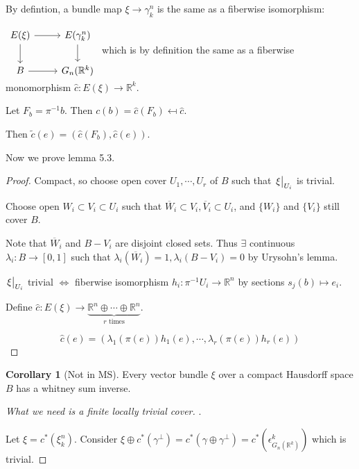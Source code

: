 \documentclass{article}
\theoremstyle{definition}
\newtheorem{corollary}[theorem]{Corollary}
\begin{document}
    By defintion, a bundle map \(\xi \to \gamma_k^n\) is the same as a fiberwise isomorphism:
    
    \(\begin{tikzcd}E(\xi) \ar[r] \ar[d] & E(\gamma_k^n) \ar[d] \\ B \ar[r] & G_n(\mathbb{R}^k)\end{tikzcd}\) which is by definition the same as a fiberwise monomorphism \(\hat{c}: E(\xi) \to \mathbb{R}^k\).

    Let \(F_b = \pi ^{-1} b\). Then \(c(b) = \hat{c}(F_b) \mapsfrom \hat{c}\).

    Then \(\widetilde{c}(e) = (\hat{c}(F_b), \hat{c}(e))\).
    
    Now we prove lemma 5.3.

    \begin{proof}
        Compact, so choose open cover \(U_1, \cdots , U_r\) of \(B\) such that \(\eval{\xi}_{U_i}\) is trivial.
        
        Choose open \(W_i \subset V_i \subset U_i\) such that \(\overline{W}_i \subset V_i, \overline{V}_i \subset U_i\), and \(\{ W_i \}\) and \(\{ V_i \}\) still cover \(B\).

        Note that \(\overline{W}_i\) and \(B - V_i\) are disjoint closed sets. Thus \(\exists\) continuous \(\lambda_i: B \to [0,1]\) such that \(\lambda_i(\overline{W}_i) = 1, \lambda_i(B - V_i) = 0\) by Urysohn's lemma.

        \(\eval{\xi}_{U_i}\) trivial \(\iff\) fiberwise isomorphism \(h_i: \pi ^{-1} U_i \to \mathbb{R}^n\) by sections \(s_j(b) \mapsto e_i\).

        Define \(\hat{c}: E(\xi) \to \underbrace{\mathbb{R}^n \oplus \cdots \oplus \mathbb{R}^n}_{r \text{ times}}\).

        \[
            \hat{c}(e) = (\lambda_1(\pi(e)) h_1(e), \cdots , \lambda_r(\pi(e)) h_r(e))
        \]

    \end{proof}

    \begin{corollary}
        [Not in MS] Every vector bundle \(\xi\) over a compact Hausdorff space \(B\) has a whitney sum inverse.
    \end{corollary}

    \begin{proof}
        [What we need is a finite locally trivial cover].

        Let \(\xi = c^{\ast} (\xi^n_k)\). Consider \(\xi \oplus c^{\ast} (\gamma^{\perp}) = c^{\ast} (\gamma \oplus \gamma^{\perp}) = c^{\ast} (\epsilon^k_{G_n(\mathbb{R}^k)})\) which is trivial. 
    \end{proof}
\end{document}
